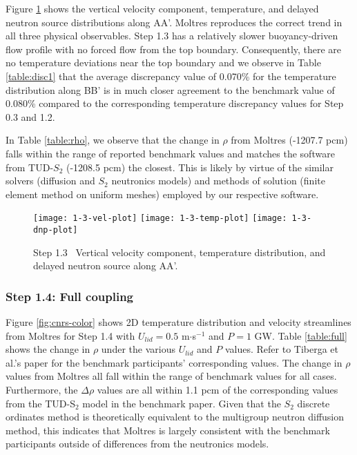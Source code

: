 Figure \ref{fig:1.3} shows the vertical velocity component, temperature, and
delayed neutron source distributions along AA'.
Moltres reproduces the correct trend in all three physical
observables. Step 1.3 has a relatively slower buoyancy-driven flow profile with
no forced flow from the top boundary. Consequently, there are no temperature
deviations near the top boundary and we observe in Table \ref{table:disc1} that
the average discrepancy value of 0.070\% for the temperature distribution along
BB' is in much closer agreement to the benchmark value of 0.080\% compared to
the corresponding temperature discrepancy values for Step 0.3 and 1.2.

In Table \ref{table:rho}, we observe that the change in $\rho$ from
Moltres (-1207.7 pcm) falls within the range of reported benchmark values and
matches the software from TUD-$S_2$ (-1208.5 pcm) the closest. This is likely
by virtue of the similar solvers (diffusion and $S_2$ neutronics models) and
methods of solution (finite element method on uniform meshes) employed by our
respective software.
%
\begin{figure}[htb]
	\centering
	\texttt{[image: 1-3-vel-plot]}
	\texttt{[image: 1-3-temp-plot]}
	\texttt{[image: 1-3-dnp-plot]}
	\caption{Step 1.3 \textemdash\ Vertical velocity component, temperature distribution,
	and delayed neutron source along AA'.}
	\label{fig:1.3}
\end{figure}

\FloatBarrier

\subsubsection{Step 1.4: Full coupling}

Figure \ref{fig:cnrs-color} shows 2D temperature distribution and velocity
streamlines from Moltres for Step 1.4 with $U_{lid} = 0.5$ m$\cdot$s$^{-1}$ and
$P = 1$ GW. Table \ref{table:full} shows the change in $\rho$ under the various
$U_{lid}$ and $P$ values. Refer to Tiberga et al.'s paper
\cite{tiberga_results_2020} for the benchmark participants' corresponding
values. The change in $\rho$ values from Moltres all fall within the range of
benchmark values
for all cases. Furthermore, the $\Delta\rho$ values are all within 1.1 pcm of
the corresponding values from the TUD-S$_2$ model in the benchmark paper. Given
that the $S_2$ discrete ordinates method is theoretically equivalent to the
multigroup neutron diffusion method, this indicates that Moltres is largely
consistent with the benchmark participants outside of differences from the
neutronics models.

